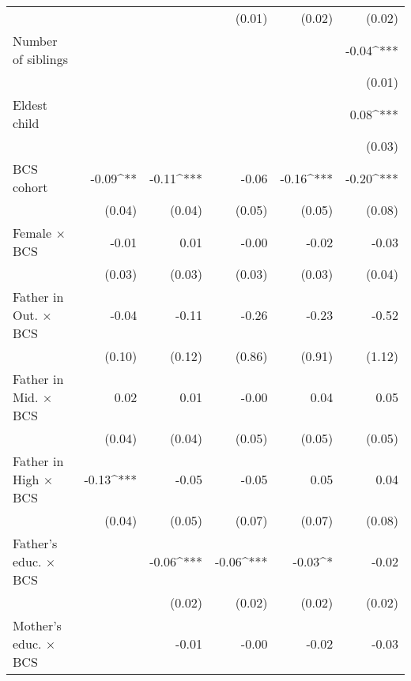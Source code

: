 \begin{tabular}{l D{.}{.}{5.5} D{.}{.}{5.5} D{.}{.}{5.5} D{.}{.}{5.5} D{.}{.}{5.5}}
                                 &             &             & (0.01)      & (0.02)      & (0.02)      \\
Number of siblings               &             &             &             &             & -0.04^{***} \\
                                 &             &             &             &             & (0.01)      \\
Eldest child                     &             &             &             &             & 0.08^{***}  \\
                                 &             &             &             &             & (0.03)      \\
BCS cohort                       & -0.09^{**}  & -0.11^{***} & -0.06       & -0.16^{***} & -0.20^{***} \\
                                 & (0.04)      & (0.04)      & (0.05)      & (0.05)      & (0.08)      \\
Female $\times$ BCS              & -0.01       & 0.01        & -0.00       & -0.02       & -0.03       \\
                                 & (0.03)      & (0.03)      & (0.03)      & (0.03)      & (0.04)      \\
Father in Out. $\times$ BCS      & -0.04       & -0.11       & -0.26       & -0.23       & -0.52       \\
                                 & (0.10)      & (0.12)      & (0.86)      & (0.91)      & (1.12)      \\
Father in Mid. $\times$ BCS      & 0.02        & 0.01        & -0.00       & 0.04        & 0.05        \\
                                 & (0.04)      & (0.04)      & (0.05)      & (0.05)      & (0.05)      \\
Father in High $\times$ BCS      & -0.13^{***} & -0.05       & -0.05       & 0.05        & 0.04        \\
                                 & (0.04)      & (0.05)      & (0.07)      & (0.07)      & (0.08)      \\
Father's educ. $\times$ BCS      &             & -0.06^{***} & -0.06^{***} & -0.03^{*}   & -0.02       \\
                                 &             & (0.02)      & (0.02)      & (0.02)      & (0.02)      \\
Mother's educ. $\times$ BCS      &             & -0.01       & -0.00       & -0.02       & -0.03       \\

\end{tabular}
